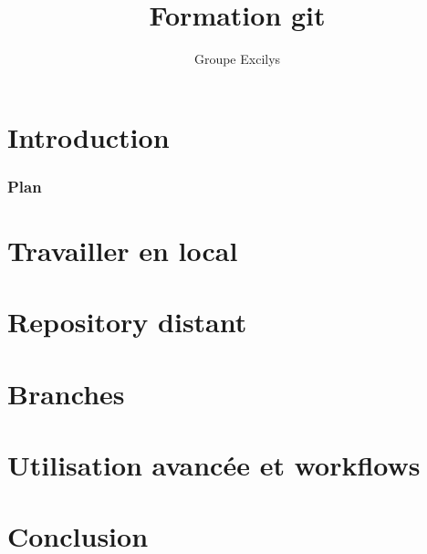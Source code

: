 \documentclass{beamer}
\title{Formation git}
\author{Groupe Excilys}
\begin{document}

\section*{Introduction}

\begin{frame}\frametitle{Plan}
\tableofcontents
\end{frame}
\section{Travailler en local}

\section{Repository distant}

\section{Branches}

\section{Utilisation avancée et workflows}

\section*{Conclusion}

\end{document}
